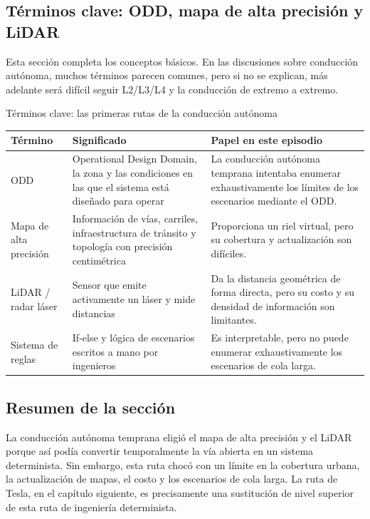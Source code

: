 \subsection{Términos clave: ODD, mapa de alta precisión y LiDAR}

Esta sección completa los conceptos básicos. En las discusiones sobre conducción autónoma, muchos términos parecen comunes, pero si no se explican, más adelante será difícil seguir L2/L3/L4 y la conducción de extremo a extremo.

\begin{knowledgebox}{Términos clave: las primeras rutas de la conducción autónoma}
\noindent\begin{tabularx}{\textwidth}{p{}p{}X}
\toprule
Término & Significado & Papel en este episodio \\
\midrule
ODD & Operational Design Domain, la zona y las condiciones en las que el sistema está diseñado para operar & La conducción autónoma temprana intentaba enumerar exhaustivamente los límites de los escenarios mediante el ODD. \\
Mapa de alta precisión & Información de vías, carriles, infraestructura de tránsito y topología con precisión centimétrica & Proporciona un riel virtual, pero su cobertura y actualización son difíciles. \\
LiDAR / radar láser & Sensor que emite activamente un láser y mide distancias & Da la distancia geométrica de forma directa, pero su costo y su densidad de información son limitantes. \\
Sistema de reglas & If-else y lógica de escenarios escritos a mano por ingenieros & Es interpretable, pero no puede enumerar exhaustivamente los escenarios de cola larga. \\
\bottomrule
\end{tabularx}
\end{knowledgebox}

\subsection{Resumen de la sección}

La conducción autónoma temprana eligió el mapa de alta precisión y el LiDAR porque así podía convertir temporalmente la vía abierta en un sistema determinista. Sin embargo, esta ruta chocó con un límite en la cobertura urbana, la actualización de mapas, el costo y los escenarios de cola larga. La ruta de Tesla, en el capítulo siguiente, es precisamente una sustitución de nivel superior de esta ruta de ingeniería determinista.
